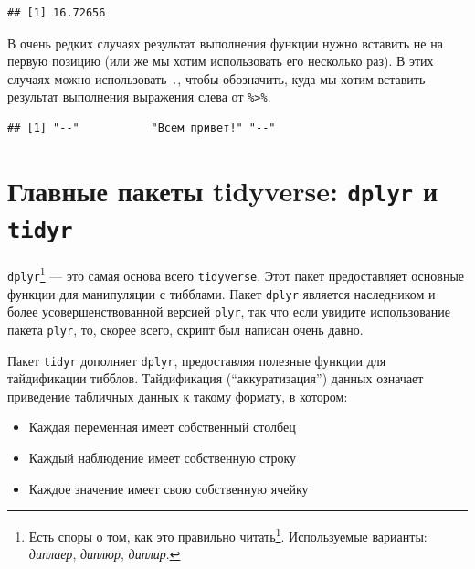 \documentclass[
]{book}
\newenvironment{Shaded}{\begin{snugshade}}{\end{snugshade}}
\newcommand{\KeywordTok}[1]{\textcolor[rgb]{0.13,0.29,0.53}{\textbf{#1}}}
\newcommand{\NormalTok}[1]{#1}
\newcommand{\OperatorTok}[1]{\textcolor[rgb]{0.81,0.36,0.00}{\textbf{#1}}}
\newcommand{\StringTok}[1]{\textcolor[rgb]{0.31,0.60,0.02}{#1}}
\providecommand{\tightlist}{%
  \setlength{\itemsep}{0pt}\setlength{\parskip}{0pt}}
\renewcommand{\href}[2]{#2\footnote{\url{#1}}}
\begin{document}
\begin{verbatim}
## [1] 16.72656
\end{verbatim}

В очень редких случаях результат выполнения функции нужно вставить не на первую позицию (или же мы хотим использовать его несколько раз). В этих случаях можно использовать \texttt{.}, чтобы обозначить, куда мы хотим вставить результат выполнения выражения слева от \texttt{\%\textgreater{}\%}.

\begin{Shaded}
\end{Shaded}

\begin{verbatim}
## [1] "--"           "Всем привет!" "--"
\end{verbatim}

\hypertarget{ux433ux43bux430ux432ux43dux44bux435-ux43fux430ux43aux435ux442ux44b-tidyverse-dplyr-ux438-tidyr}{%
\section{\texorpdfstring{Главные пакеты tidyverse: \texttt{dplyr} и \texttt{tidyr}}{Главные пакеты tidyverse: dplyr и tidyr}}\label{ux433ux43bux430ux432ux43dux44bux435-ux43fux430ux43aux435ux442ux44b-tidyverse-dplyr-ux438-tidyr}}

\texttt{dplyr}\footnote{\href{https://community.rstudio.com/t/pronunciations-of-common-r-terms/1810}{Есть споры о том, как это правильно читать}. Используемые варианты: \emph{диплаер}, \emph{диплюр}, \emph{диплир}.} --- это самая основа всего \texttt{tidyverse}. Этот пакет предоставляет основные функции для манипуляции с тибблами. Пакет \texttt{dplyr} является наследником и более усовершенствованной версией \texttt{plyr}, так что если увидите использование пакета \texttt{plyr}, то, скорее всего, скрипт был написан очень давно.

Пакет \texttt{tidyr} дополняет \texttt{dplyr}, предоставляя полезные функции для тайдификации тибблов.
Тайдификация (``аккуратизация'') данных означает приведение табличных данных к такому формату, в котором:

\begin{itemize}
\tightlist
\item
  Каждая переменная имеет собственный столбец
\item
  Каждый наблюдение имеет собственную строку
\item
  Каждое значение имеет свою собственную ячейку
\end{itemize}
\end{document}
